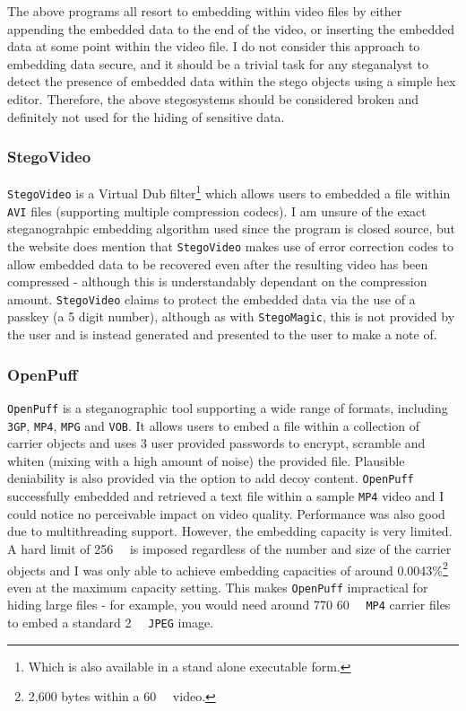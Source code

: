 \documentclass[paper=a4, fontsize=11pt,twoside]{scrartcl}    %
\numberwithin{table}{section}
\numberwithin{figure}{section}
\numberwithin{algorithm}{section}
\begin{document}
\noindent
The above programs all resort to embedding within video files by either appending the embedded data to the end of the video, or inserting the embedded data at some point within the video file. I do not consider this approach to embedding data secure, and it should be a trivial task for any steganalyst to detect the presence of embedded data within the stego objects using a simple hex editor. Therefore, the above stegosystems should be considered broken and definitely not used for the hiding of sensitive data.

\subsubsection{StegoVideo}

\texttt{StegoVideo} is a Virtual Dub filter\footnote{Which is also available in a stand alone executable form.} which allows users to embedded a file within \texttt{AVI} files (supporting multiple compression codecs). I am unsure of the exact steganograhpic embedding algorithm used since the program is closed source, but the website does mention that \texttt{StegoVideo} makes use of error correction codes to allow embedded data to be recovered even after the resulting video has been compressed - although this is understandably dependant on the compression amount. \texttt{StegoVideo} claims to protect the embedded data via the use of a passkey (a 5 digit number), although as with \texttt{StegoMagic}, this is not provided by the user and is instead generated and presented to the user to make a note of.

\subsubsection{OpenPuff}

\texttt{OpenPuff} is a steganographic tool supporting a wide range of formats, including \texttt{3GP}, \texttt{MP4}, \texttt{MPG} and \texttt{VOB}. It allows users to embed a file within a collection of carrier objects and uses 3 user provided passwords to encrypt, scramble and whiten (mixing with a high amount of noise) the provided file. Plausible deniability is also provided via the option to add decoy content. \texttt{OpenPuff} successfully embedded and retrieved a text file within a sample \texttt{MP4} video and I could notice no perceivable impact on video quality. Performance was also good due to multithreading support. However, the embedding capacity is very limited. A hard limit of \SI{256}{\mega\byte} is imposed regardless of the number and size of the carrier objects and I was only able to achieve embedding capacities of around 0.0043\%\footnote{2,600 bytes within a \SI{60}{\mega\byte} video.} even at the maximum capacity setting. This makes \texttt{OpenPuff} impractical for hiding large files - for example, you would need around 770 \SI{60}{\mega\byte} \texttt{MP4} carrier files to embed a standard \SI{2}{\mega\byte} \texttt{JPEG} image.
\end{document}
